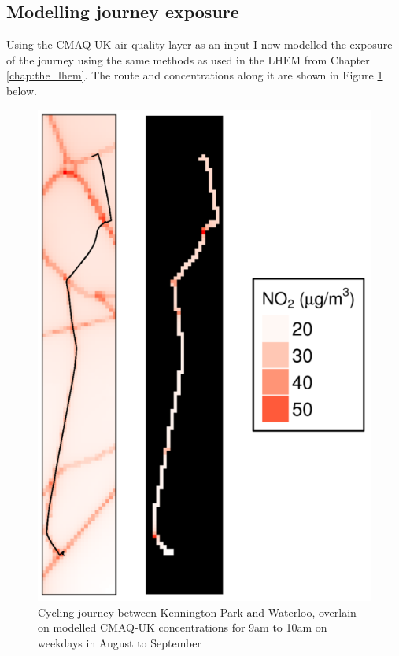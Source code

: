 \subsection{Modelling journey exposure}
\label{subsec:modellingjourneyexposure}

Using the CMAQ-UK air quality layer as an input I now modelled the exposure of the journey using the same methods as used in the LHEM from Chapter \ref{chap:the_lhem}. The route and concentrations along it are shown in Figure \ref{fig:dual_exposure_cycling} below.

\begin{figure}[H]
\centering
\includegraphics[scale=1]{images/dual_exposure_cycling.png}
\caption{Cycling journey between Kennington Park and Waterloo, overlain on modelled CMAQ-UK concentrations for 9am to 10am on weekdays in August to September}
\label{fig:dual_exposure_cycling}
\end{figure}

